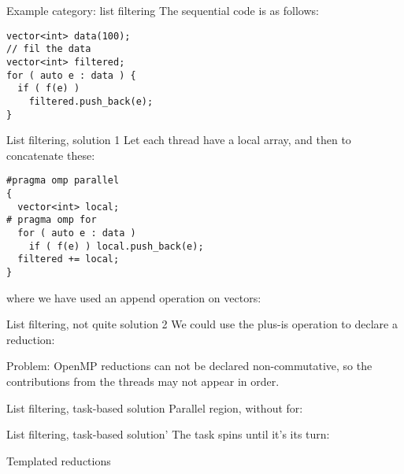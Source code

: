 \documentclass[10pt]{beamer}
\begin{document}
\begin{numberedframe}{Example category: list filtering}
The sequential code is as follows:
\begin{lstlisting}
vector<int> data(100);
// fil the data
vector<int> filtered;
for ( auto e : data ) {
  if ( f(e) )
    filtered.push_back(e);
}
\end{lstlisting}
\end{numberedframe}

\begin{numberedframe}{List filtering, solution 1}
  Let each thread have a local array,
  and then to concatenate these:
\begin{lstlisting}
#pragma omp parallel
{
  vector<int> local;
# pragma omp for
  for ( auto e : data )
    if ( f(e) ) local.push_back(e);
  filtered += local;
}
\end{lstlisting}
where we have used an append operation on vectors:
\end{numberedframe}

\begin{numberedframe}{List filtering, not quite solution 2}
We could use the plus-is operation to declare a reduction:

Problem: OpenMP reductions can not be declared non-commutative,
so the contributions from the threads
may not appear in order.

\end{numberedframe}

\begin{numberedframe}{List filtering, task-based solution}
  Parallel region, without for:
\end{numberedframe}

\begin{numberedframe}{List filtering, task-based solution'}
  The task spins until it's its turn:
\end{numberedframe}

\begin{numberedframe}{Templated reductions}
  
\end{numberedframe}

\end{document}
